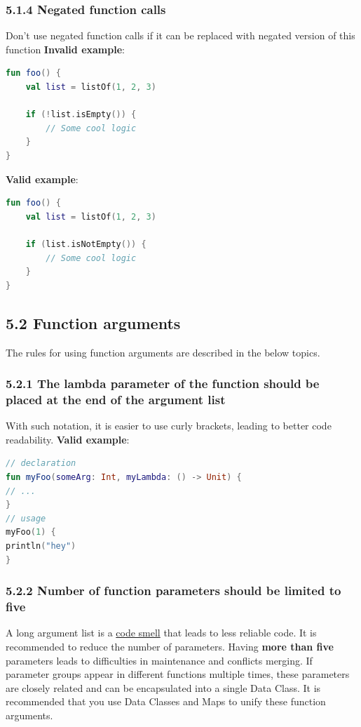 \subsubsection*{\textbf{5.1.4 Negated function calls}}
\leavevmode\newline
\label{sec:5.1.4}
Don't use negated function calls if it can be replaced with negated version of this function
\textbf{Invalid example}:
\begin{lstlisting}[language=Kotlin]
fun foo() { 
    val list = listOf(1, 2, 3)
  
    if (!list.isEmpty()) {
        // Some cool logic
    }
} 
\end{lstlisting}
\textbf{Valid example}:
\begin{lstlisting}[language=Kotlin]
fun foo() { 
    val list = listOf(1, 2, 3)
  
    if (list.isNotEmpty()) {
        // Some cool logic
    }
} 
\end{lstlisting}
\subsection*{\textbf{5.2 Function arguments}}
\label{sec:5.2}
The rules for using function arguments are described in the below topics.
\subsubsection*{\textbf{5.2.1 The lambda parameter of the function should be placed at the end of the argument list}}
\leavevmode\newline
\label{sec:5.2.1}
With such notation, it is easier to use curly brackets, leading to better code readability.
\textbf{Valid example}:
\begin{lstlisting}[language=Kotlin]
// declaration
fun myFoo(someArg: Int, myLambda: () -> Unit) {
// ...
}
// usage
myFoo(1) { 
println("hey")
}
\end{lstlisting}
\subsubsection*{\textbf{5.2.2 Number of function parameters should be limited to five}}
\leavevmode\newline
\label{sec:5.2.2}
A long argument list is a \href{https://en.wikipedia.org/wiki/Code\_smell}{code smell} that leads to less reliable code.
It is recommended to reduce the number of parameters. Having \textbf{more than five} parameters leads to difficulties in maintenance and conflicts merging.
If parameter groups appear in different functions multiple times, these parameters are closely related and can be encapsulated into a single Data Class.
It is recommended that you use Data Classes and Maps to unify these function arguments.
